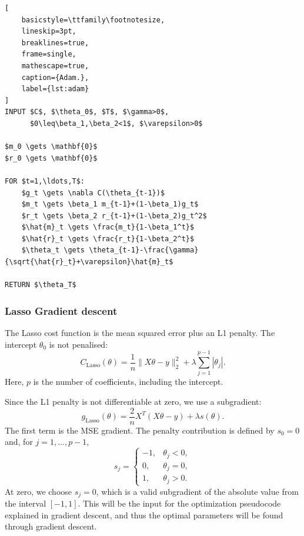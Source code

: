 \documentclass[aps,rmp,reprint,raggedbottom,amsmath,amssymb,longbibliography]{revtex4-1}
\let\label\ReportKernelLabel
\begin{document}
\noindent\begin{minipage}{\linewidth}
\begin{lstlisting}[
    basicstyle=\ttfamily\footnotesize,
    lineskip=3pt,
    breaklines=true,
    frame=single,
    mathescape=true,
    caption={Adam.},
    label={lst:adam}
]
INPUT $C$, $\theta_0$, $T$, $\gamma>0$,
      $0\leq\beta_1,\beta_2<1$, $\varepsilon>0$

$m_0 \gets \mathbf{0}$
$r_0 \gets \mathbf{0}$

FOR $t=1,\ldots,T$:
    $g_t \gets \nabla C(\theta_{t-1})$
    $m_t \gets \beta_1 m_{t-1}+(1-\beta_1)g_t$
    $r_t \gets \beta_2 r_{t-1}+(1-\beta_2)g_t^2$
    $\hat{m}_t \gets \frac{m_t}{1-\beta_1^t}$
    $\hat{r}_t \gets \frac{r_t}{1-\beta_2^t}$
    $\theta_t \gets \theta_{t-1}-\frac{\gamma}{\sqrt{\hat{r}_t}+\varepsilon}\hat{m}_t$

RETURN $\theta_T$
\end{lstlisting}
\end{minipage}

\subsubsection{Lasso Gradient descent}
\label{subsec:Lasso_GD}
The Lasso cost function is the mean squared error plus an
L1 penalty. The intercept $\theta_0$ is not penalised:
\begin{equation}
  C_{\mathrm{Lasso}}(\theta)
  = \frac{1}{n}\|X\theta-y\|_2^2
    + \lambda\sum_{j=1}^{p-1}|\theta_j|.
\end{equation}
Here, $p$ is the number of coefficients, including the intercept.

Since the L1 penalty is not differentiable at zero,
we use a subgradient:
\begin{equation}
  g_{\mathrm{Lasso}}(\theta)
  = \frac{2}{n}X^T(X\theta-y) + \lambda s(\theta).
\end{equation}
The first term is the MSE gradient. The penalty contribution
is defined by $s_0=0$ and, for $j=1,\ldots,p-1$,
\begin{equation}
  s_j =
  \begin{cases}
    -1, & \theta_j < 0, \\
    0, & \theta_j = 0, \\
    1, & \theta_j > 0.
  \end{cases}
\end{equation}
At zero, we choose $s_j=0$, which is a valid subgradient
of the absolute value from the interval $[-1,1]$.
This will be the input for the optimization pseudocode explained
in gradient descent, and thus the optimal parameters will
be found through gradient descent.
\end{document}
